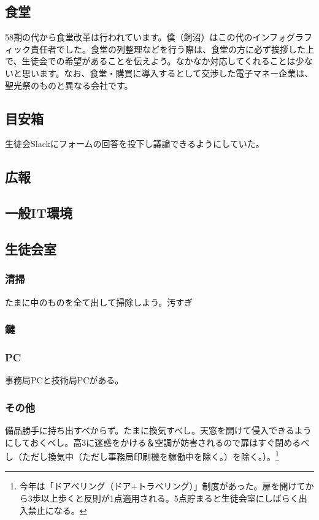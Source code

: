 \documentclass[dvipdfmx,jb5]{jarticle}
\begin{document}
\subsection{食堂}
58期の代から食堂改革は行われています。僕（飼沼）はこの代のインフォグラフィック責任者でした。食堂の列整理などを行う際は、食堂の方に必ず挨拶した上で、生徒会での希望があることを伝えよう。なかなか対応してくれることは少ないと思います。なお、食堂・購買に導入するとして交渉した電子マネー企業は、聖光祭のものと異なる会社です。

\subsection{目安箱}
生徒会Slackにフォームの回答を投下し議論できるようにしていた。
\subsection{広報}
\subsection{一般IT環境}
\subsection{生徒会室}
\subsubsection{清掃}
たまに中のものを全て出して掃除しよう。汚すぎ
\subsubsection{鍵}
\subsubsection{PC}
事務局PCと技術局PCがある。
\subsubsection{その他}
備品勝手に持ち出すべからず。たまに換気すべし。天窓を開けて侵入できるようにしておくべし。高3に迷惑をかける＆空調が妨害されるので扉はすぐ閉めるべし（ただし換気中（ただし事務局印刷機を稼働中を除く。）を除く。）。\footnote{今年は「ドアベリング（ドア+トラベリング）」制度があった。扉を開けてから3歩以上歩くと反則が1点適用される。5点貯まると生徒会室にしばらく出入禁止になる。}
\end{document}
